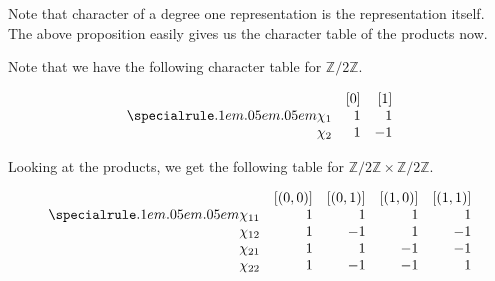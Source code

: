 Note that character of a degree one representation is the representation itself. The above proposition easily gives us the character table of the products now.

\begin{ex}
	Note that we have the following character table for $\mathbb{Z}/2\mathbb{Z}.$

	\[\begin{array}{rrr}
		 & [0] & [1]\\
		\thiccline
		\chi_1 & 1 & 1\\
		\chi_2 & 1 & -1
	\end{array}\]

	Looking at the products, we get the following table for $\mathbb{Z}/2\mathbb{Z} \times \mathbb{Z}/2\mathbb{Z}.$

	\captionsetup{type=figure}
	\[\begin{array}{rrrrr}
		 & [(0, 0)] & [(0, 1)] & [(1, 0)] & [(1, 1)]\\
		\thiccline
		\chi_{11} & 1 & 1 & 1 & 1\\
		\chi_{12} & 1 & -1 & 1 & -1\\
		\chi_{21} & 1 & 1 & -1 & -1 \\
		\chi_{22} & 1 & -1 & -1 & 1
	\end{array}\]
	 \label{tab:charklein}
\end{ex}